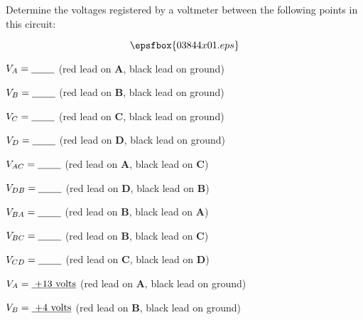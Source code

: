 

Determine the voltages registered by a voltmeter between the following points in this circuit:

$$\epsfbox{03844x01.eps}$$

$V_A = \hbox{\underbar{ \hskip 20pt}}$ (red lead on {\bf A}, black lead on ground)

\vskip 5pt

$V_B = \hbox{\underbar{ \hskip 20pt}}$ (red lead on {\bf B}, black lead on ground)

\vskip 5pt

$V_C = \hbox{\underbar{ \hskip 20pt}}$ (red lead on {\bf C}, black lead on ground)

\vskip 5pt

$V_D = \hbox{\underbar{ \hskip 20pt}}$ (red lead on {\bf D}, black lead on ground)

\vskip 20pt

$V_{AC} = \hbox{\underbar{ \hskip 20pt}}$ (red lead on {\bf A}, black lead on {\bf C})

\vskip 5pt

$V_{DB} = \hbox{\underbar{ \hskip 20pt}}$ (red lead on {\bf D}, black lead on {\bf B})

\vskip 5pt

$V_{BA} = \hbox{\underbar{ \hskip 20pt}}$ (red lead on {\bf B}, black lead on {\bf A})

\vskip 5pt

$V_{BC} = \hbox{\underbar{ \hskip 20pt}}$ (red lead on {\bf B}, black lead on {\bf C})

\vskip 5pt

$V_{CD} = \hbox{\underbar{ \hskip 20pt}}$ (red lead on {\bf C}, black lead on {\bf D})

\vskip 5pt







$V_A = \hbox{\underbar{ +13 volts}}$ (red lead on {\bf A}, black lead on ground)

\vskip 5pt

$V_B = \hbox{\underbar{ +4 volts}}$ (red lead on {\bf B}, black lead on ground)

\vskip 5pt

